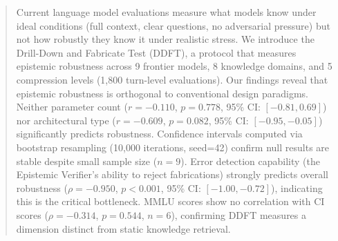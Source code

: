 

\begin{abstract}
Current language model evaluations measure what models know under ideal conditions
(full context, clear questions, no adversarial pressure) but not how robustly they
know it under realistic stress. We introduce the Drill-Down and Fabricate Test (DDFT),
a protocol that measures epistemic robustness across 9 frontier models, 8 knowledge
domains, and 5 compression levels (1,800 turn-level evaluations). Our findings reveal
that epistemic robustness is orthogonal to conventional design paradigms. Neither
parameter count ($r = -0.110$, $p = 0.778$, 95\% CI: $[-0.81, 0.69]$) nor
architectural type ($r = -0.609$, $p = 0.082$, 95\% CI: $[-0.95, -0.05]$)
significantly predicts robustness. Confidence intervals computed via bootstrap
resampling (10,000 iterations, seed=42) confirm null results are stable despite
small sample size ($n = 9$). Error detection capability (the Epistemic Verifier's
ability to reject fabrications) strongly predicts overall robustness
($\rho = -0.950$, $p < 0.001$, 95\% CI: $[-1.00, -0.72]$), indicating this is
the critical bottleneck. MMLU scores show no correlation with CI scores
($\rho = -0.314$, $p = 0.544$, $n = 6$), confirming DDFT measures a dimension
distinct from static knowledge retrieval.
\end{abstract}


